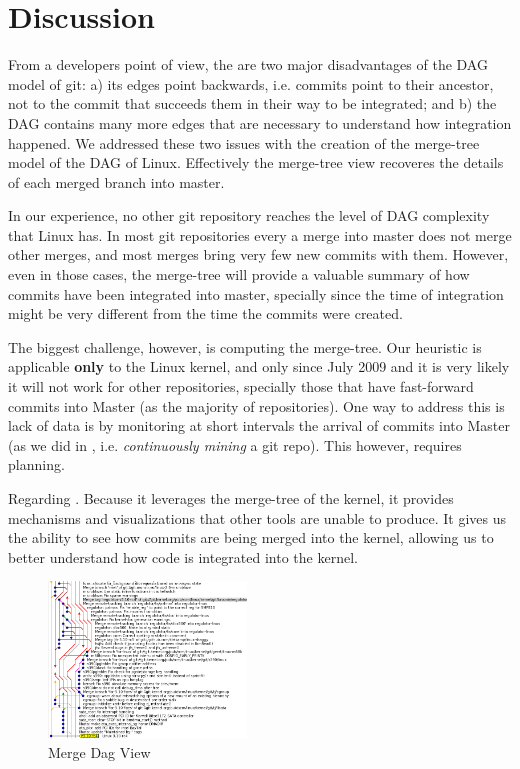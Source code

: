 \documentclass[conference, draftclsnofoot, draft]{IEEEtran}
\begin{document}
\section{Discussion}

From a developers point of view, the are two major disadvantages of the DAG model of git: a) its edges point backwards, i.e. commits point to their ancestor,
not to the commit that succeeds them in their way to be integrated; and b) the DAG contains many more edges that are necessary to understand how integration
happened. We addressed these two issues with the creation of the merge-tree model of the DAG of Linux. Effectively the merge-tree view recoveres the details of each merged
branch into master.

In our experience, no other git repository reaches the level of DAG complexity that Linux has. In most git repositories  every a merge into master does not
merge other merges, and most merges bring very few new commits with them. However, even in those cases, the merge-tree will provide a valuable summary of how
commits have been integrated into master, specially since the time of integration might be very different from the time the commits were created.

The biggest challenge, however, is computing the merge-tree. Our heuristic is applicable \textbf{only} to the Linux kernel, and only since July 2009 and it is
very likely it will not work for other repositories, specially those that have fast-forward commits into Master (as the majority of repositories). One way to
address this is lack of data is by monitoring at short intervals the arrival of commits into Master (as we did in \cite{German2015}, i.e.
\emph{continuously mining} a git repo). This however, requires planning.

Regarding \tool. Because it leverages the merge-tree of the kernel, it provides mechanisms and visualizations that other tools are unable to
produce.  It gives us the ability to see how commits are being merged
into the kernel, allowing us to better understand how code is integrated into the kernel.

\begin{figure}
        \centering
        \includegraphics[width=0.47\textwidth]{figures/042dd_DAG.png}
        \caption{Merge Dag View}
        \label{fig:dag_view}
\end{figure}
\end{document}
